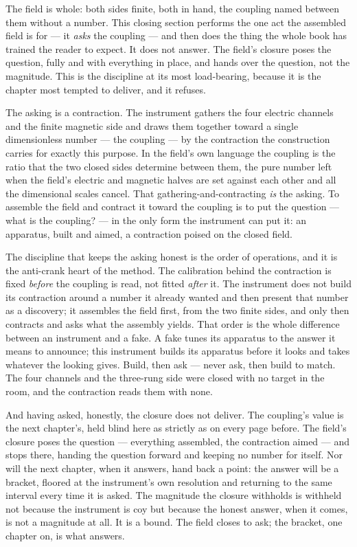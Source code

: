 The field is whole: both sides finite, both in hand, the coupling named between them without a number. This closing section
performs the one act the assembled field is for --- it \emph{asks} the coupling --- and then does the thing the whole book
has trained the reader to expect. It does not answer. The field's closure poses the question, fully and with everything in
place, and hands over the question, not the magnitude. This is the discipline at its most load-bearing, because it is the
chapter most tempted to deliver, and it refuses.

The asking is a contraction. The instrument gathers the four electric channels and the finite magnetic side and draws them
together toward a single dimensionless number --- the coupling --- by the contraction the construction carries for exactly
this purpose. In the field's own language the coupling is the ratio that the two closed sides determine between them, the
pure number left when the field's electric and magnetic halves are set against each other and all the dimensional scales
cancel. That gathering-and-contracting \emph{is} the asking. To assemble the field and contract it toward the coupling is to
put the question --- what is the coupling? --- in the only form the instrument can put it: an apparatus, built and aimed, a
contraction poised on the closed field.

The discipline that keeps the asking honest is the order of operations, and it is the anti-crank heart of the method. The
calibration behind the contraction is fixed \emph{before} the coupling is read, not fitted \emph{after} it. The instrument
does not build its contraction around a number it already wanted and then present that number as a discovery; it assembles
the field first, from the two finite sides, and only then contracts and asks what the assembly yields. That order is the
whole difference between an instrument and a fake. A fake tunes its apparatus to the answer it means to announce; this
instrument builds its apparatus before it looks and takes whatever the looking gives. Build, then ask --- never ask, then
build to match. The four channels and the three-rung side were closed with no target in the room, and the contraction reads
them with none.

And having asked, honestly, the closure does not deliver. The coupling's value is the next chapter's, held blind here as
strictly as on every page before. The field's closure poses the question --- everything assembled, the contraction aimed ---
and stops there, handing the question forward and keeping no number for itself. Nor will the next chapter, when it answers,
hand back a point: the answer will be a bracket, floored at the instrument's own resolution and returning to the same
interval every time it is asked. The magnitude the closure withholds is withheld not because the instrument is coy but
because the honest answer, when it comes, is not a magnitude at all. It is a bound. The field closes to ask; the bracket, one
chapter on, is what answers.

